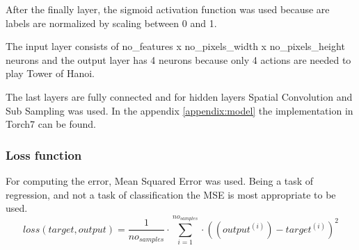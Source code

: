 After the finally layer, the sigmoid activation function was used because are labels are normalized by scaling between 0 and 1.

The input layer consists of no_features x no_pixels_width x no_pixels_height neurons and the output layer has 4 neurons because only 4 actions are needed to play Tower of Hanoi.

The last layers are fully connected and for hidden layers Spatial Convolution and Sub Sampling was used. In the appendix \ref{appendix:model} the implementation in Torch7 can be found.

\subsubsection{Loss function}
For computing the error, Mean Squared Error was used. Being a task of regression, and not a task of classification the MSE is most appropriate to be used.
\begin{equation}
loss(target,output) = \frac{1}{no_{samples}}\cdot\displaystyle\sum_{i=1}^{no_{samples}}\cdot((output^{(i)}) - target^{(i)})^2
\end{equation}
\newpage
